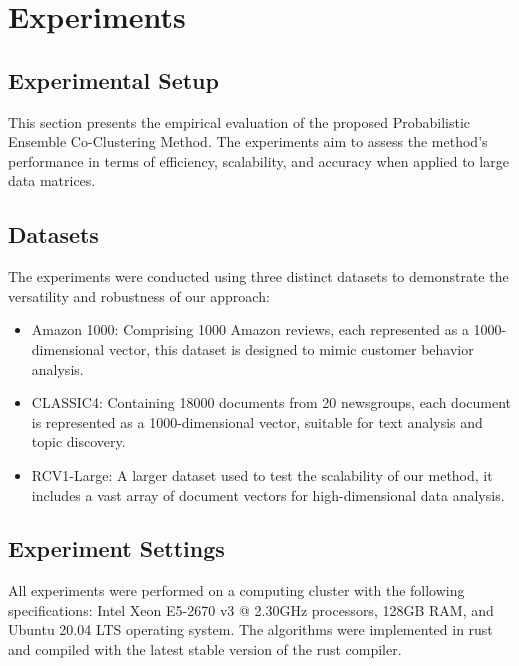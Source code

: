 
\section{Experiments}
\label{sec:experiment}

\subsection{Experimental Setup}

This section presents the empirical evaluation of the proposed Probabilistic Ensemble Co-Clustering Method. The experiments aim to assess the method's performance in terms of efficiency, scalability, and accuracy when applied to large data matrices.

\subsection{Datasets}

The experiments were conducted using three distinct datasets to demonstrate the versatility and robustness of our approach:

\begin{itemize}
    \item Amazon 1000: Comprising 1000 Amazon reviews, each represented as a 1000-dimensional vector, this dataset is designed to mimic customer behavior analysis.
    \item CLASSIC4: Containing 18000 documents from 20 newsgroups, each document is represented as a 1000-dimensional vector, suitable for text analysis and topic discovery.
    \item RCV1-Large: A larger dataset used to test the scalability of our method, it includes a vast array of document vectors for high-dimensional data analysis.
\end{itemize}

\subsection{Experiment Settings}
All experiments were performed on a computing cluster with the following specifications: Intel Xeon E5-2670 v3 @ 2.30GHz processors, 128GB RAM, and Ubuntu 20.04 LTS operating system. The algorithms were implemented in rust and compiled with the latest stable version of the rust compiler. 

